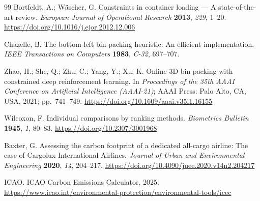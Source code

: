 \documentclass[12pt,a4paper]{article}
\begin{document}
\begin{thebibliography}{99}
Bortfeldt, A.; W\"{a}scher, G. Constraints in container loading --- A
state-of-the-art review.
\textit{European Journal of Operational Research} \textbf{2013},
\textit{229}, 1--20.
\url{https://doi.org/10.1016/j.ejor.2012.12.006}

Chazelle, B. The bottom-left bin-packing heuristic: An efficient
implementation.
\textit{IEEE Transactions on Computers} \textbf{1983}, \textit{C-32},
697--707.

Zhao, H.; She, Q.; Zhu, C.; Yang, Y.; Xu, K. Online 3D bin packing
with constrained deep reinforcement learning.
In \textit{Proceedings of the 35th AAAI Conference on Artificial
Intelligence (AAAI-21)};
AAAI Press: Palo Alto, CA, USA, 2021; pp.~741--749.
\url{https://doi.org/10.1609/aaai.v35i1.16155}

Wilcoxon, F. Individual comparisons by ranking methods.
\textit{Biometrics Bulletin} \textbf{1945}, \textit{1}, 80--83.
\url{https://doi.org/10.2307/3001968}

Baxter, G. Assessing the carbon footprint of a dedicated all-cargo
airline: The case of Cargolux International Airlines.
\textit{Journal of Urban and Environmental Engineering} \textbf{2020},
\textit{14}, 204--217.
\url{https://doi.org/10.4090/juee.2020.v14n2.204217}

ICAO. ICAO Carbon Emissions Calculator, 2025.
\url{https://www.icao.int/environmental-protection/environmental-tools/icec}

\end{thebibliography}
\end{document}
